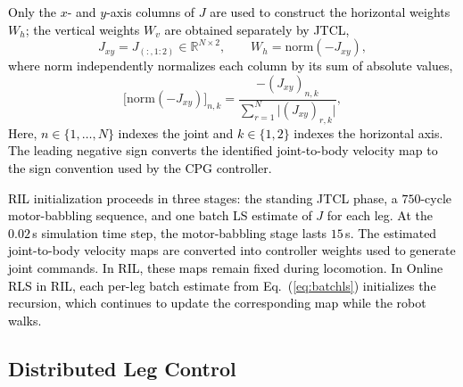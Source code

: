 \documentclass[a4paper, 10pt, conference]{ieeeconf}
\newcommand{\Jm}{J}
\newcommand{\oldtext}[1]{\textcolor{red}{}}
\newcommand{\newtext}[1]{\textcolor{black}{#1}}
\begin{document}
\newtext{Only the $x$- and $y$-axis columns of $J$ are used to construct the
horizontal weights $W_h$; the vertical weights $W_v$ are obtained separately by
JTCL,}
\begin{equation}
  \Jm_{xy} = \Jm_{(:,1:2)}\in\mathbb{R}^{N\times2},
  \qquad
  W_h = \mathrm{norm}(-\Jm_{xy}),
  \label{eq:wh}
\end{equation}
\newtext{where $\mathrm{norm}$ independently normalizes each column by
its sum of absolute values,}
\begin{equation}
  \bigl[\mathrm{norm}(-\Jm_{xy})\bigr]_{n,k}
    = \frac{-(\Jm_{xy})_{n,k}}{\sum_{r=1}^{N}\bigl|(\Jm_{xy})_{r,k}\bigr|} ,
  \label{eq:norm}
\end{equation}
\newtext{Here, $n\in\{1,\ldots,N\}$ indexes the joint and $k\in\{1,2\}$
indexes the horizontal axis. The leading negative sign converts the identified
joint-to-body velocity map to the sign convention used by the CPG controller.}

\newtext{RIL initialization proceeds in three stages: the standing JTCL phase,
a $750$-cycle motor-babbling sequence, and one batch LS estimate of $J$ for each
leg. At the $0.02$\,s simulation time step, the motor-babbling stage lasts
$15$\,s. The estimated joint-to-body velocity maps are converted into controller
weights used to generate joint commands. In RIL, these maps remain fixed during
locomotion. In Online RLS in RIL, each per-leg batch estimate from
Eq.~(\ref{eq:batchls}) initializes the recursion, which continues to
update the corresponding map while the robot walks.}

\subsection{Distributed Leg Control}
\label{sec:dlc}
\end{document}
